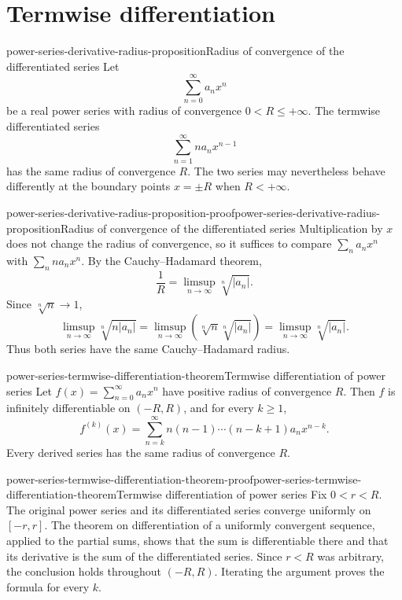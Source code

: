 \documentclass[preview]{standalone}
\begin{document}
\genpage

\section{Termwise differentiation}

\begin{snippetproposition}{power-series-derivative-radius-proposition}{Radius of convergence of the differentiated series}
    Let
    \[
        \sum_{n=0}^{\infty}a_nx^n
    \]
    be a real power series with radius of convergence
    \(0<R\leq+\infty\). The termwise differentiated series
    \[
        \sum_{n=1}^{\infty}na_nx^{n-1}
    \]
    has the same radius of convergence \(R\). The two series may nevertheless
    behave differently at the boundary points \(x=\pm R\) when \(R<+\infty\).
\end{snippetproposition}

\begin{snippetproof}{power-series-derivative-radius-proposition-proof}{power-series-derivative-radius-proposition}{Radius of convergence of the differentiated series}
    Multiplication by \(x\) does not change the radius of convergence, so it
    suffices to compare \(\sum_na_nx^n\) with \(\sum_nna_nx^n\). By the
    Cauchy--Hadamard theorem,
    \[
        \frac1R=\limsup_{n\to\infty}\sqrt[n]{|a_n|}.
    \]
    Since \(\sqrt[n]{n}\to1\),
    \[
        \limsup_{n\to\infty}\sqrt[n]{n|a_n|}
        =\limsup_{n\to\infty}
        \left(\sqrt[n]{n}\sqrt[n]{|a_n|}\right)
        =\limsup_{n\to\infty}\sqrt[n]{|a_n|}.
    \]
    Thus both series have the same Cauchy--Hadamard radius.
\end{snippetproof}

\begin{snippettheorem}{power-series-termwise-differentiation-theorem}{Termwise differentiation of power series}
    Let \(f(x)=\sum_{n=0}^{\infty}a_nx^n\) have positive radius of
    convergence \(R\). Then \(f\) is infinitely differentiable on
    \((-R,R)\), and for every \(k\geq1\),
    \[
        f^{(k)}(x)
        =\sum_{n=k}^{\infty}
        n(n-1)\cdots(n-k+1)a_nx^{n-k}.
    \]
    Every derived series has the same radius of convergence \(R\).
\end{snippettheorem}

\begin{snippetproof}{power-series-termwise-differentiation-theorem-proof}{power-series-termwise-differentiation-theorem}{Termwise differentiation of power series}
    Fix \(0<r<R\). The original power series and its differentiated series
    converge uniformly on \([-r,r]\). The theorem on differentiation of a
    uniformly convergent sequence, applied to the partial sums, shows that the
    sum is differentiable there and that its derivative is the sum of the
    differentiated series. Since \(r<R\) was arbitrary, the conclusion holds
    throughout \((-R,R)\). Iterating the argument proves the formula for every
    \(k\).
\end{snippetproof}
\end{document}
